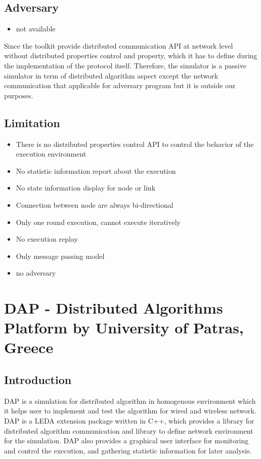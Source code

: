 \subsection*{Adversary}
\begin{itemize}
\item not available
\end{itemize}

Since the toolkit provide distributed communication API at network level without distributed properties control and property, which it has to define during the implementation of  the protocol itself. Therefore, the simulator is a passive simulator in term of distributed algorithm aspect except the network communication that applicable for adversary program but it is outside our purposes.

\subsection*{Limitation}
\begin{itemize}
\item There is no distributed properties control API to control the behavior of the execution environment
\item No statistic information report about the execution
\item No state information display for node or link
\item Connection between node are always bi-directional
\item Only one round execution, cannot execute iteratively
\item No execution replay
\item Only message passing model
\item no adversary
\end{itemize}









\section{DAP - Distributed Algorithms Platform by University of Patras, Greece}

\subsection*{Introduction}
DAP is a simulation for distributed algorithm in homogenous environment which it helps user to implement and test the algorithm for wired and wireless network. DAP is a LEDA extension package written in C++, which provides a library for distributed algorithm communication and library to define network environment for the simulation. DAP also provides a graphical user interface for monitoring and control the execution, and gathering statistic information for later analysis.

